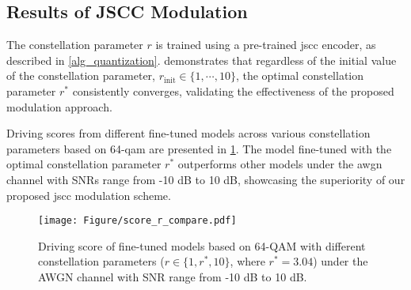 \subsection{Results of JSCC Modulation}
The constellation parameter $r$ is trained using a pre-trained \gls{jscc} encoder, as described in \cref{alg_quantization}.  demonstrates that regardless of the initial value of the constellation parameter, $r_{\text{init}}\in \{1,\cdots,10 \}$, the optimal constellation parameter $r^*$ consistently converges, validating the effectiveness of the proposed modulation approach.
 
Driving scores from different fine-tuned models across various constellation parameters based on 64-\gls{qam} are presented in \cref{fig:Q_score}. The model fine-tuned with the optimal constellation parameter $r^*$ outperforms other models under the \gls{awgn} channel with SNRs range from -10 dB to 10 dB, showcasing the superiority of our proposed \gls{jscc} modulation scheme.

\begin{figure*}[htbp]
    \centering
    \hspace{0.001in}
    \hspace{0.001in}
    \caption{Training of the constellation parameter for 16-QAM, 64-QAM, and 256-QAM. Regardless of the initial value of the constellation parameter, the optimal value consistently converges.}
    \label{fig:Q_train}
\end{figure*}


\begin{figure}[t]
\centering
    \begin{center}
    \texttt{[image: Figure/score\_r\_compare.pdf]}
    \end{center}
       \caption{Driving score of fine-tuned models based on 64-QAM with different constellation parameters ($r\in \{1, r^*, 10\}$, where $r^*=3.04$) under the AWGN channel with SNR range from -10 dB to 10 dB.}
    \label{fig:Q_score}
\end{figure}

